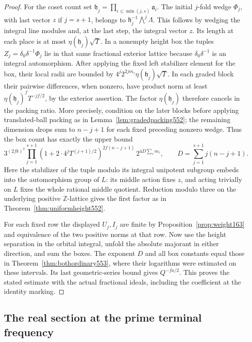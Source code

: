 \documentclass[a4paper,11pt]{article}
\theoremstyle{definition}
\theoremstyle{remark}
\newcommand{\ZZ}{\mathbb Z}\newcommand{\ord}{\operatorname{ord}}
\numberwithin{equation}{section}
\begin{document}
\begin{proof}
For the coset count set
\(\mathfrak h_j=\prod_{i\le\min(j,s)}\mathfrak a_i\).
The initial \(j\)-fold wedge \(\Phi_j\), with last vector \(z\)
if \(j=s+1\), belongs to
\(\mathfrak h_j^{-1}\bigwedge^j\Lambda\). This follows by
wedging the integral line modules and, at the last step,
the integral vector \(z\). Its length at each place is at most
\(\eta(\mathfrak h_j)\sqrt T\). In a nonempty height box the
tuples \(Z_j=\delta_0\delta^{-1}\Phi_j\) lie in that same
fractional exterior lattice because \(\delta_0\delta^{-1}\)
is an integral automorphism. After applying the fixed left
stabilizer element for the box, their local radii are bounded
by \(4^j2^{2jm_\tau}\eta(\mathfrak h_j)\sqrt T\).
In each graded block their pairwise differences, when nonzero,
have product norm at least
\(\eta(\mathfrak h_j)^f T^{-jf/2}\), by the exterior assertion.
The factor \(\eta(\mathfrak h_j)\) therefore cancels in the
packing ratio. More precisely, condition on the later blocks
before applying translated-ball packing as in
Lemma~\ref{lem:gradedpacking552}; the remaining dimension
drops sum to \(n-j+1\) for each fixed preceding nonzero wedge.
Thus the box count has exactly the upper bound
\[
  3^{(2fk)^2}
  \prod_{j=1}^{s+1}(1+2\cdot4^j T^{(j+1)/2})^{2f(n-j+1)}
  \,2^{4D\sum_\tau m_\tau},
  \qquad D=\sum_{j=1}^{s+1}j(n-j+1).
\]
Here the stabilizer of the tuple modulo its integral unipotent
subgroup embeds into the automorphism group of \(L\): its middle
action fixes \(z\), and acting trivially on \(L\) fixes the
whole rational middle quotient. Reduction modulo three on the
underlying positive \(\ZZ\)-lattice gives the first factor as
in Theorem~\ref{thm:uniformheight552}.

For each fixed row the displayed \(U_j,I_j\) are finite by
Proposition~\ref{prop:weight163} and equivalence of the two
positive norms at that row. Now use the height separation in
the orbital integral, unfold the absolute majorant in either
direction, and sum the boxes. The exponent \(D\) and all box
constants equal those in Theorem~\ref{thm:bothordinary553},
where their logarithms were estimated on these intervals.
Its last geometric-series bound gives \(Q^{-fa/2}\).
This proves the stated estimate with the actual fractional
ideals, including the coefficient at the identity marking.
\end{proof}


\subsection{The real section at the prime terminal frequency}
\label{sec:realheight555}
\end{document}
